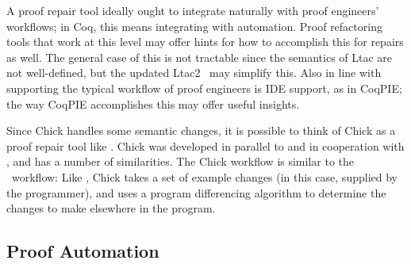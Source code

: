 A proof repair tool ideally ought to integrate naturally with proof engineers' workflows;
in Coq, this means integrating with automation.
Proof refactoring tools that work at this level may offer hints for how to accomplish this for repairs as well.
The general case of this is not tractable since the semantics of Ltac are not well-defined,
but the updated Ltac2~\cite{ltac2}
may simplify this.
Also in line with supporting the typical workflow of proof engineers is IDE support,
as in CoqPIE; the way CoqPIE accomplishes this %
may offer useful insights.

Since Chick handles some semantic changes, it is possible to think of Chick as a proof repair tool like \sysname.
Chick was developed in parallel to and in cooperation with \sysname, and has a number of similarities.
The Chick workflow is similar to the \sysname\ workflow:
Like \sysname, Chick takes a set of example changes (in this case, supplied by the programmer),
and uses a program differencing algorithm to determine the changes to make elsewhere in the program.

\iffalse
Chick also has some clear differences from \sysname, aside from operating over the Chick language instead of Gallina itself.
Unlike early versions of \sysname, Chick also applies the changes it finds to derive the new program.
However, Chick does this using a syntactic algorithm that handles simple transformations and does
not provide guarantees on the output; for some changes to inductive types, for example, not all proofs from
the old program are preserved in the new program, and the algorithm may fail %
on this class of changes. \devoid\ focuses on applying these changes for a class of changes like this
with semantic guarantess. %
It may be possible to integrate the techniques from Chick, \sysname, and \devoid\
into the same tool and use them to advance the state of proof repair.
\fi

\subsection*{Proof Automation}


